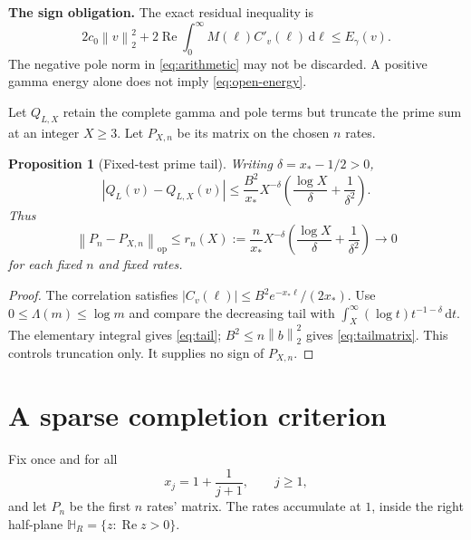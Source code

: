 \documentclass[11pt,letterpaper]{article}
\newtheorem{proposition}[theorem]{Proposition}
\theoremstyle{definition}
\theoremstyle{remark}
\newcommand{\dd}{\,\mathrm d}
\newcommand{\HH}{\mathbb H_R}
\newcommand{\op}{\mathrm{op}}
\newcommand{\Rea}{\operatorname{Re}}
\newcommand{\norm}[1]{\left\lVert#1\right\rVert}
\newcommand{\abs}[1]{\left\lvert#1\right\rvert}
\numberwithin{equation}{section}
\begin{document}
\textbf{The sign obligation.} The exact residual inequality is
\begin{equation}\label{eq:open-energy}
 2c_0\norm v_2^2+2\Rea\int_0^\infty M(\ell)C'_v(\ell)\dd\ell
 \le E_\gamma(v).
\end{equation}
The negative pole norm in \eqref{eq:arithmetic} may not be discarded. A positive gamma energy alone does not imply \eqref{eq:open-energy}.

Let $Q_{L,X}$ retain the complete gamma and pole terms but truncate the prime sum at an integer $X\ge3$. Let $P_{X,n}$ be its matrix on the chosen $n$ rates.
\begin{proposition}[Fixed-test prime tail]\label{prop:tail}
Writing $\delta=x_*-1/2>0$,
\begin{equation}\label{eq:tail}
 \abs{Q_L(v)-Q_{L,X}(v)}\le
 \frac{B^2}{x_*}X^{-\delta}
 \left(\frac{\log X}{\delta}+\frac1{\delta^2}\right).
\end{equation}
Thus
\begin{equation}\label{eq:tailmatrix}
 \norm{P_n-P_{X,n}}_\op\le r_n(X):=
 \frac n{x_*}X^{-\delta}
 \left(\frac{\log X}{\delta}+\frac1{\delta^2}\right)\longrightarrow0
\end{equation}
for each fixed $n$ and fixed rates.
\end{proposition}
\begin{proof}
The correlation satisfies $\abs{C_v(\ell)}\le B^2e^{-x_*\ell}/(2x_*)$. Use $0\le\Lambda(m)\le\log m$ and compare the decreasing tail with
$\int_X^\infty(\log t)t^{-1-\delta}\dd t$. The elementary integral gives \eqref{eq:tail}; $B^2\le n\norm b_2^2$ gives \eqref{eq:tailmatrix}. This controls truncation only. It supplies no sign of $P_{X,n}$.
\end{proof}

\section{A sparse completion criterion}

Fix once and for all
\begin{equation}\label{eq:sequence}
 x_j=1+\frac1{j+1},\qquad j\ge1,
\end{equation}
and let $P_n$ be the first $n$ rates' matrix. The rates accumulate at $1$, inside the right half-plane $\HH=\{z:\Rea z>0\}$.
\end{document}
